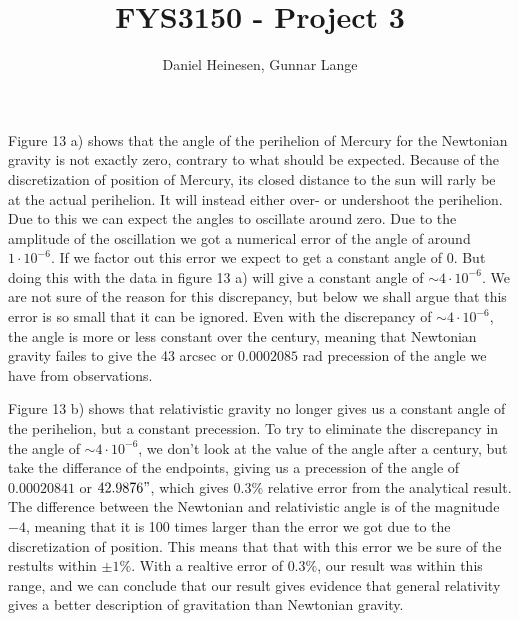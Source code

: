\documentclass[a4paper, 10pt]{article}
\title{FYS3150 - Project 3}
\author{Daniel Heinesen, Gunnar Lange}
\begin{document}
\maketitle



Figure 13 a) shows that the angle of the perihelion of Mercury for the Newtonian gravity is not exactly zero, contrary to what should be expected. Because of the discretization of position of Mercury, its closed distance to the sun will rarly be at the actual perihelion. It will instead either over- or undershoot the perihelion. Due to this we can expect the angles to oscillate around zero. Due to the amplitude of the oscillation we got a numerical error of the angle of around $1\cdot 10^{-6}$. If we factor out this error we expect to get a constant angle of 0. But doing this with the data in figure 13 a) will give a constant angle of $\sim 4 \cdot 10^{-6}$. We are not sure of the reason for this discrepancy, but below we shall argue that this error is so small that it can be ignored. Even with the discrepancy of $\sim 4 \cdot 10^{-6}$, the angle is more or less constant over the century, meaning that Newtonian gravity failes to give the 43 arcsec or $0.0002085$ rad precession of the angle we have from observations. \linebreak

Figure 13 b) shows that relativistic gravity no longer gives us a constant angle of the perihelion, but a constant precession. To try to eliminate the discrepancy in the angle of $\sim 4 \cdot 10^{-6}$, we don't look at the value of the angle after a century, but take the differance of the endpoints, giving us a precession of the angle of $0.00020841$ or $42.9876"$, which gives $0.3\%$ relative error from the analytical result. \\

The difference between the Newtonian and relativistic angle is of the magnitude $-4$, meaning that it is 100 times larger than the error we got due to the discretization of position. This means that that with this error we be sure of the restults within $\pm 1\%$. With a realtive error of $0.3 \%$, our result was within this range, and we can conclude that our result gives evidence that general relativity gives a better description of gravitation than Newtonian gravity. 
\end{document}
